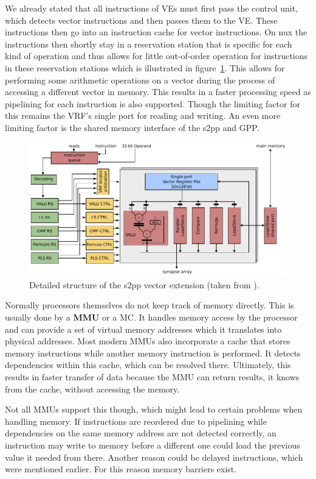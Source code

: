 {We already stated that all instructions of \ac{VE}s must first pass the control unit, which detects vector instructions and then passes them to the \ac{VE}.
These instructions then go into an instruction cache for vector instructions. 
On nux the instructions then shortly stay in a reservation station that is specific for each kind of operation and thus allows for little out-of-order operation for instructions in these reservation stations which is illustrated in figure~\ref{fig:s2pp}.
This allows for performing some arithmetic operations on a vector during the process of accessing a different vector in memory.
This results in a faster processing speed as pipelining for each instruction is also supported.
Though the limiting factor for this remains the \ac{VRF}'s single port for reading and writing.
An even more limiting factor is the shared memory interface of the \ac{s2pp} and \ac{GPP}.
\begin{figure}[htbp]
    \centering
    \includegraphics[width=\textwidth]{pictures/s2pp.pdf}
    \caption{\label{fig:s2pp} Detailed structure of the \ac{s2pp} vector extension (taken from \citeauthor{PPU}).}
\end{figure}

Normally processors themselves do not keep track of memory directly.
This is usually done by a \textbf{\ac{MMU}} or a \ac{MC}.
It handles memory access by the processor and can provide a set of virtual memory addresses which it translates into physical addresses.
Most modern \ac{MMU}s also incorporate a cache that stores memory instructions while another memory instruction is performed.
It detects dependencies within this cache, which can be resolved there.
Ultimately, this results in faster transfer of data because the \ac{MMU} can return results, it knows from the cache, without accessing the memory.

Not all \ac{MMU}s support this though, which might lead to certain problems when handling memory.
If instructions are reordered due to pipelining while dependencies on the same memory address are not detected correctly, an instruction may write to memory before a different one could load the previous value it needed from there.
Another reason could be delayed instructions, which were mentioned earlier.
For this reason memory barriers exist.

}
